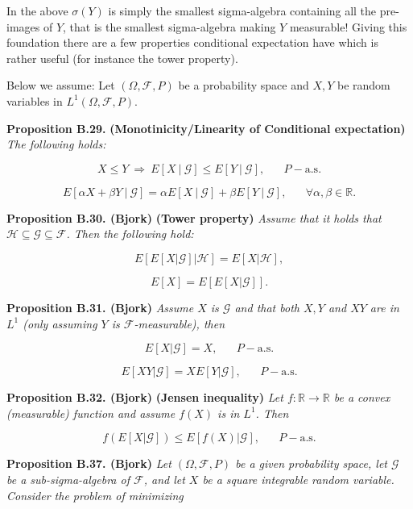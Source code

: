 \documentclass[a4paper,10pt,openany]{book}
\begin{document}
In the above \(\sigma(Y)\) is simply the smallest sigma-algebra containing all the pre-images of \(Y\), that is the smallest sigma-algebra making \(Y\) measurable! Giving this foundation there are a few properties conditional expectation have which is rather useful (for instance the tower property).

Below we assume: Let \((\Omega,\mathcal{F},P)\) be a probability space and \(X,Y\) be random variables in \(L^1(\Omega,\mathcal{F},P)\).

\textbf{Proposition B.29.} \textbf{(Monotinicity/Linearity of Conditional expectation)} \emph{The following holds:}

\[
X\le Y\ \Rightarrow\ E[X\ \vert\ \mathcal{G}]\le E[Y\ \vert\ \mathcal{G}],\hspace{20pt}P-\text{a.s.}\tag{B.6}
\]

\[
E[\alpha X + \beta Y\ \vert\ \mathcal{G}]=\alpha E[X\ \vert\ \mathcal{G}]+ \beta E[Y\ \vert\ \mathcal{G}],\hspace{20pt}\forall \alpha,\beta\in\mathbb{R}.\tag{B.7}
\]

\textbf{Proposition B.30. (Bjork)} \textbf{(Tower property)} \emph{Assume that it holds that \(\mathcal{H}\subseteq\mathcal{G}\subseteq\mathcal{F}\). Then the following hold:}

\[
E[E[X\vert \mathcal{G}]\vert\mathcal{H}]=E[X\vert \mathcal{H}],\tag{B.8}
\]

\[
E[X]=E[E[X\vert \mathcal{G}]].\tag{B.9}
\]

\textbf{Proposition B.31. (Bjork)} \emph{Assume \(X\) is \(\mathcal{G}\) and that both \(X,Y\) and \(XY\) are in \(L^1\) (only assuming \(Y\) is \(\mathcal{F}\)-measurable), then}

\[
E[X\vert\mathcal{G}]=X,\hspace{20pt}P-\text{a.s.}\tag{B.11}
\]

\[
E[XY\vert\mathcal{G}]=XE[Y\vert\mathcal{G}],\hspace{20pt}P-\text{a.s.}\tag{B.12}
\]

\textbf{Proposition B.32. (Bjork)} \textbf{(Jensen inequality)} \emph{Let \(f:\mathbb{R}\to\mathbb{R}\) be a convex (measurable) function and assume \(f(X)\) is in \(L^1\). Then}

\[
f(E[X\vert\mathcal{G}])\le E[f(X)\vert\mathcal{G}],\hspace{20pt}P-\text{a.s.}
\]

\textbf{Proposition B.37. (Bjork)} \emph{Let \((\Omega,\mathcal{F},P)\) be a given probability space, let \(\mathcal{G}\) be a sub-sigma-algebra of \(\mathcal{F}\), and let \(X\) be a square integrable random variable.
Consider the problem of minimizing}
\end{document}
